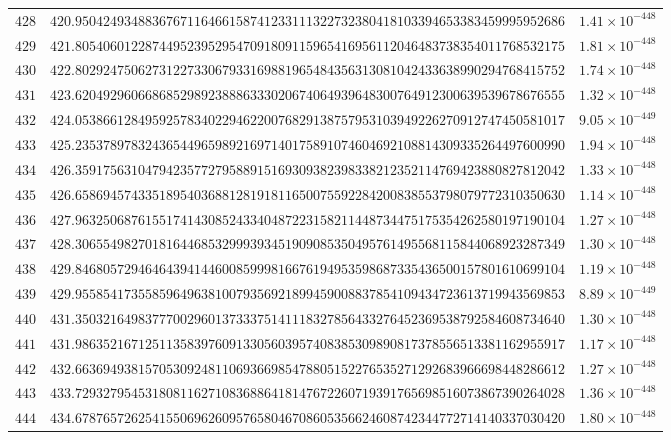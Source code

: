\documentclass[12pt,reqno]{amsart}
\theoremstyle{remark}
\begin{document}
\begin{longtable}{clc}
$428$ & $420.9504249348836767116466158741233111322732380418103394653383459995952686$ & $1.41\times 10^{-448}$ \\
$429$ & $421.8054060122874495239529547091809115965416956112046483738354011768532175$ & $1.81\times 10^{-448}$ \\
$430$ & $422.8029247506273122733067933169881965484356313081042433638990294768415752$ & $1.74\times 10^{-448}$ \\
$431$ & $423.6204929606686852989238886333020674064939648300764912300639539678676555$ & $1.32\times 10^{-448}$ \\
$432$ & $424.0538661284959257834022946220076829138757953103949226270912747450581017$ & $9.05\times 10^{-449}$ \\
$433$ & $425.2353789783243654496598921697140175891074604692108814309335264497600990$ & $1.94\times 10^{-448}$ \\
$434$ & $426.3591756310479423577279588915169309382398338212352114769423880827812042$ & $1.33\times 10^{-448}$ \\
$435$ & $426.6586945743351895403688128191811650075592284200838553798079772310350630$ & $1.14\times 10^{-448}$ \\
$436$ & $427.9632506876155174143085243340487223158211448734475175354262580197190104$ & $1.27\times 10^{-448}$ \\
$437$ & $428.3065549827018164468532999393451909085350495761495568115844068923287349$ & $1.30\times 10^{-448}$ \\
$438$ & $429.8468057294646439414460085999816676194953598687335436500157801610699104$ & $1.19\times 10^{-448}$ \\
$439$ & $429.9558541735585964963810079356921899459008837854109434723613719943569853$ & $8.89\times 10^{-449}$ \\
$440$ & $431.3503216498377700296013733375141118327856433276452369538792584608734640$ & $1.30\times 10^{-448}$ \\
$441$ & $431.9863521671251135839760913305603957408385309890817378556513381162955917$ & $1.17\times 10^{-448}$ \\
$442$ & $432.6636949381570530924811069366985478805152276535271292683966698448286612$ & $1.27\times 10^{-448}$ \\
$443$ & $433.7293279545318081162710836886418147672260719391765698516073867390264028$ & $1.36\times 10^{-448}$ \\
$444$ & $434.6787657262541550696260957658046708605356624608742344772714140337030420$ & $1.80\times 10^{-448}$ \\

\end{longtable}
\end{document}
